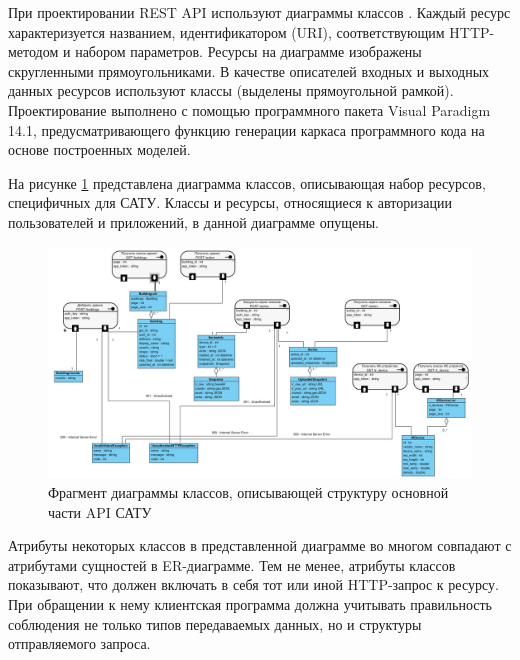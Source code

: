	При проектировании REST API используют диаграммы классов \cite{design:rest-uml}. Каждый ресурс характеризуется названием, идентификатором (URI), соответствующим HTTP-методом и набором параметров. Ресурсы на диаграмме изображены скругленными прямоугольниками. В качестве описателей входных и выходных данных ресурсов используют классы (выделены прямоугольной рамкой). Проектирование выполнено с помощью программного пакета Visual Paradigm 14.1, предусматривающего функцию генерации каркаса программного кода на основе построенных моделей.

	На рисунке \ref{uml:1} представлена диаграмма классов, описывающая набор ресурсов, специфичных для САТУ. Классы и ресурсы, относящиеся к авторизации пользователей и приложений, в данной диаграмме опущены.

	\pagebreak

	\begin{landscape}

		\begin{figure}[t!]
		      \centering
		      \includegraphics[width=1.3\textwidth]{images/uml/1}
		      \caption{Фрагмент диаграммы классов, описывающей структуру основной части API САТУ}
		      \label{uml:1}
		\end{figure}

	\end{landscape}

	\pagebreak

	Атрибуты некоторых классов в представленной диаграмме во многом совпадают с атрибутами сущностей в ER-диаграмме. Тем не менее, атрибуты классов показывают, что должен включать в себя тот или иной HTTP-запрос к ресурсу. При обращении к нему клиентская программа должна учитывать правильность соблюдения не только типов передаваемых данных, но и структуры отправляемого запроса.

